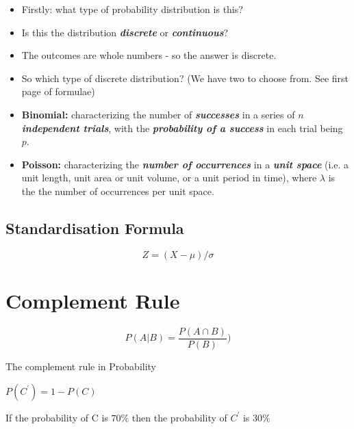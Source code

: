 \documentclass[12pt]{report}
\begin{document}
{\LARGE
	\begin{itemize}
		\item Firstly: what type of probability distribution is this?
		
		\item Is this the distribution \textbf{\emph{discrete}} or  \textbf{\emph{continuous}}?
		
		\item The outcomes are whole numbers - so the answer is discrete.
		
		\item So which type of discrete distribution? (We have two to choose from. See first page of formulae)
		
		
		\item \textbf{Binomial:} characterizing the number of \textbf{\emph{successes}} in a series of \textbf{\emph{$n$ independent trials}}, with the \textbf{\emph{probability of a success}} in each trial being $p$.
		
		\item \textbf{Poisson:}  characterizing the \textbf{\emph{number of occurrences}} in a \textbf{\emph{unit space}} (i.e. a unit length, unit area or unit volume, or a unit period in time), where $\lambda$ is the the number of occurrences per unit space.
		
	\end{itemize}
}


\subsection{Standardisation Formula}

\begin{equation}
Z = ( X - \mu ) / \sigma
\end{equation}


\section*{Complement Rule}
		
		
\[P(A |B) = \frac{P(A \cap B)}{P(B)})\]
		
		The complement rule in Probability
		
		$P(C^{\prime}) = 1- P(C)$
		
	
If the probability of C is $70 \%$ then the probability of $C^{\prime}$ is $30\%$
		
\end{document}
